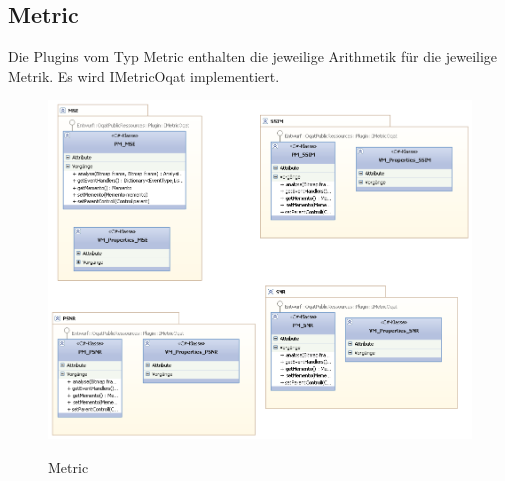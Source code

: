 \subsection{Metric}
Die Plugins vom Typ Metric enthalten die jeweilige Arithmetik für die jeweilige Metrik. Es wird IMetricOqat implementiert.
\begin{figure}[h]
\noindent\includegraphics[width=\linewidth,height=\textheight,
keepaspectratio]{bilder/metrik.png}
\label{}
\caption{Metric}
\end{figure}

\pagebreak
